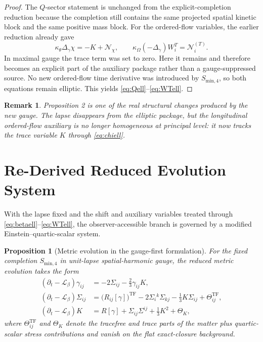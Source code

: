 \documentclass[11pt]{article}
\newcommand{\Ell}{\mathcal{L}}
\newtheorem{proposition}{Proposition}
\newtheorem{remark}{Remark}
\begin{document}
\begin{proof}
The \(Q\)-sector statement is unchanged from the explicit-completion reduction because the completion still contains the same projected spatial kinetic block and the same positive mass block. For the ordered-flow variables, the earlier reduction already gave
\[
\kappa_\theta\Delta_\gamma\chi
=
-K+\mathcal N_\chi,
\qquad
\kappa_\Omega(-\Delta_\gamma)W_i^T
=
\mathcal N_i^{(T)}.
\]
In maximal gauge the trace term was set to zero. Here it remains and therefore becomes an explicit part of the auxiliary package rather than a gauge-suppressed source. No new ordered-flow time derivative was introduced by \(S_{\mathrm{min},4}\), so both equations remain elliptic. This yields \eqref{eq:Qell}--\eqref{eq:WTell}.
\end{proof}

\begin{remark}
Proposition 2 is one of the real structural changes produced by the new gauge. The lapse disappears from the elliptic package, but the longitudinal ordered-flow auxiliary is no longer homogeneous at principal level: it now tracks the trace variable \(K\) through \eqref{eq:chiell}.
\end{remark}

\section{Re-Derived Reduced Evolution System}

With the lapse fixed and the shift and auxiliary variables treated through \eqref{eq:betaell}--\eqref{eq:WTell}, the observer-accessible branch is governed by a modified Einstein--quartic-scalar system.

\begin{proposition}[Metric evolution in the gauge-first formulation]
For the fixed completion \(S_{\mathrm{min},4}\) in unit-lapse spatial-harmonic gauge, the reduced metric evolution takes the form
\begin{align}
(\partial_t-\Ell_\beta)\gamma_{ij}
&=
-2\Sigma_{ij}
-\frac{2}{3}\gamma_{ij}K,
\label{eq:gammadt}
\\
(\partial_t-\Ell_\beta)\Sigma_{ij}
&=
\bigl(R_{ij}[\gamma]\bigr)^{\mathrm{TF}}
-2\Sigma_i{}^k\Sigma_{kj}
-\frac{1}{3}K\Sigma_{ij}
+\Theta_{ij}^{\mathrm{TF}},
\label{eq:Sigmadt}
\\
(\partial_t-\Ell_\beta)K
&=
R[\gamma]
+\Sigma_{ij}\Sigma^{ij}
+\frac{1}{3}K^2
+\Theta_K,
\label{eq:Kdt}
\end{align}
where \(\Theta_{ij}^{\mathrm{TF}}\) and \(\Theta_K\) denote the tracefree and trace parts of the matter plus quartic-scalar stress contributions and vanish on the flat exact-closure background.
\end{proposition}
\end{document}
